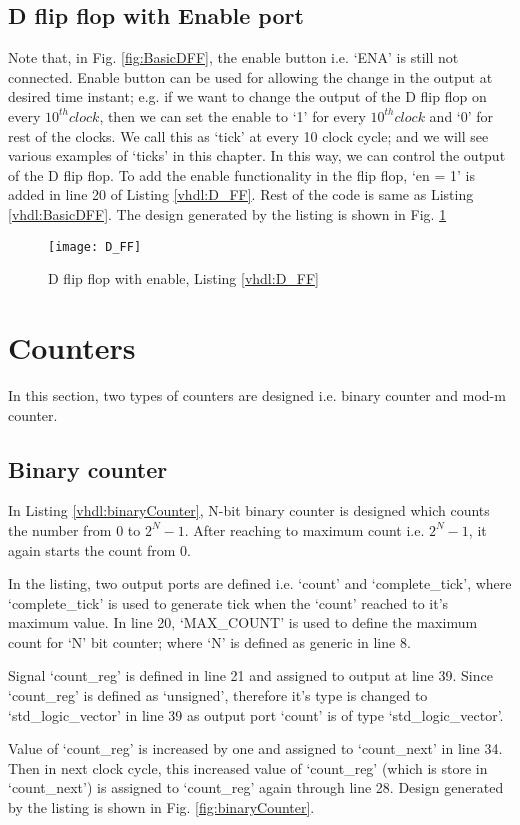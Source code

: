 \subsection{D flip flop with Enable port}
Note that, in Fig. \ref{fig:BasicDFF}, the enable button i.e. `ENA' is still not connected. Enable button can be used for allowing the change in the output at desired time instant; e.g. if we want to change the output of the D flip flop on every $10^{th} clock$, then we can set the enable to `1' for every $10^{th} clock$ and `0' for rest of the clocks. We call this as `tick' at every 10 clock cycle; and we will see various examples of `ticks' in this chapter. In this way, we can control the output of the D flip flop. To add the enable functionality in the flip flop, `en = 1' is added in line 20 of Listing \ref{vhdl:D_FF}. Rest of the code is same as Listing \ref{vhdl:BasicDFF}. The design generated by the listing is shown in Fig. \ref{fig:D_FF}



\begin{figure}[!h]
	\centering
	\texttt{[image: D\_FF]}
	\caption{D flip flop with enable, Listing \ref{vhdl:D_FF}}
	\label{fig:D_FF}
\end{figure}


\section{Counters}
In this section, two types of counters are designed i.e. binary counter and mod-m counter. 
\subsection{Binary counter}
In Listing \ref{vhdl:binaryCounter}, N-bit binary counter is designed which counts the number from 0 to $2^N-1$. After reaching to maximum count i.e. $2^N-1$, it again starts the count from 0.  

\begin{explanation}
	In the listing, two output ports are defined i.e. `count' and `complete\_tick', where `complete\_tick' is used to generate tick when the `count' reached to it's maximum value. In line 20, `MAX\_COUNT' is used to define the maximum count for `N' bit counter; where `N' is defined as generic in line 8. 
	
	Signal `count\_reg' is defined in line 21 and assigned to output at line 39. Since `count\_reg' is defined as `unsigned', therefore it's type is changed to `std\_logic\_vector' in line 39 as output port `count' is of type `std\_logic\_vector'.
	
	Value of `count\_reg' is increased by one and assigned to `count\_next' in line 34. Then in next clock cycle, this increased value of `count\_reg' (which is store in `count\_next') is assigned to  `count\_reg' again through line 28. Design generated by the listing is shown in Fig. \ref{fig:binaryCounter}.	
\end{explanation}

